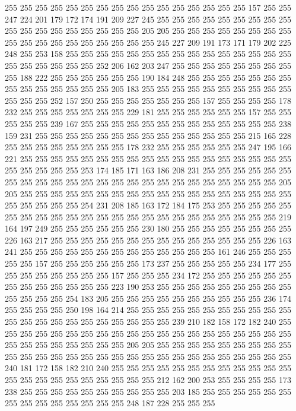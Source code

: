 255 255 255 255 255 255 255 255 255 255 255 255 255 255 255 255 157 255 255 247
224 201 179 172 174 191 209 227 245 255 255 255 255 255 255 255 255 255 255 255
255 255 255 255 255 255 255 205 205 255 255 255 255 255 255 255 255 255 255 255
255 255 255 255 255 255 255 245 227 209 191 173 171 179 202 225 248 255 253 158
255 255 255 255 255 255 255 255 255 255 255 255 255 255 255 255 255 255 255 255
255 252 206 162 203 247 255 255 255 255 255 255 255 255 255 188 222 255 255 255
255 255 255 190 184 248 255 255 255 255 255 255 255 255 255 255 255 255 255 255
205 183 255 255 255 255 255 255 255 255 255 255 255 255 255 252 157 250 255 255
255 255 255 255 255 157 255 255 255 255 178 232 255 255 255 255 255 255 255 229
181 255 255 255 255 255 255 157 255 255 255 255 255 239 167 255 255 255 255 255
255 255 255 255 255 255 255 255 238 159 231 255 255 255 255 255 255 255 255 255
255 255 255 255 255 215 165 228 255 255 255 255 255 255 255 255 178 232 255 255
255 255 255 255 247 195 166 221 255 255 255 255 255 255 255 255 255 255 255 255
255 255 255 255 255 255 255 255 255 255 255 253 174 185 171 163 186 208 231 255
255 255 255 255 255 255 255 255 255 255 255 255 255 255 255 255 255 255 255 255
255 255 255 205 205 255 255 255 255 255 255 255 255 255 255 255 255 255 255 255
255 255 255 255 255 255 255 255 254 231 208 185 163 172 184 175 253 255 255 255
255 255 255 255 255 255 255 255 255 255 255 255 255 255 255 255 255 255 255 255
219 164 197 249 255 255 255 255 255 255 230 180 255 255 255 255 255 255 255 255
226 163 217 255 255 255 255 255 255 255 255 255 255 255 255 255 255 226 163 241
255 255 255 255 255 255 255 255 255 255 255 255 255 161 246 255 255 255 255 255
157 255 255 255 255 255 255 173 237 255 255 255 255 255 234 177 255 255 255 255
255 255 255 255 157 255 255 255 234 172 255 255 255 255 255 255 255 255 255 255
255 255 255 223 190 253 255 255 255 255 255 255 255 255 255 255 255 255 255 254
183 205 255 255 255 255 255 255 255 255 255 255 236 174 255 255 255 255 250 198
164 214 255 255 255 255 255 255 255 255 255 255 255 255 255 255 255 255 255 255
255 255 255 255 239 210 182 158 172 182 240 255 255 255 255 255 255 255 255 255
255 255 255 255 255 255 255 255 255 255 255 255 255 255 255 255 255 255 255 205
205 255 255 255 255 255 255 255 255 255 255 255 255 255 255 255 255 255 255 255
255 255 255 255 255 255 255 255 255 240 181 172 158 182 210 240 255 255 255 255
255 255 255 255 255 255 255 255 255 255 255 255 255 255 255 255 255 255 212 162
200 253 255 255 255 255 173 238 255 255 255 255 255 255 255 255 255 255 203 185
255 255 255 255 255 255 255 255 255 255 255 255 255 255 248 187 228 255 255 255
